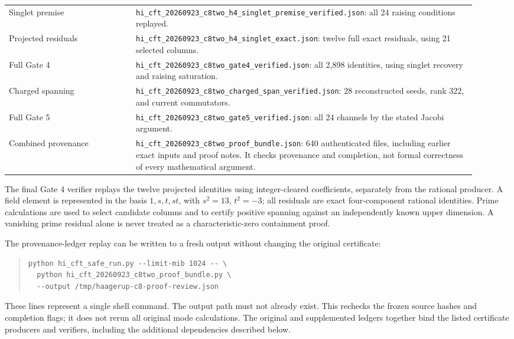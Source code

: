 \documentclass[11pt,a4paper]{article}
\theoremstyle{definition}
\newcommand{\artifact}[1]{\textnormal{\nolinkurl{#1}}}
\begin{document}
\begin{longtable}{@{}p{0.25\linewidth}p{0.67\linewidth}@{}}
Singlet premise &
\artifact{hi_cft_20260923_c8two_h4_singlet_premise_verified.json}:
all 24 raising conditions replayed.\\
Projected residuals &
\artifact{hi_cft_20260923_c8two_h4_singlet_exact.json}:
twelve full exact residuals, using 21 selected columns.\\
Full Gate 4 &
\artifact{hi_cft_20260923_c8two_gate4_verified.json}:
all 2,898 identities, using singlet recovery and raising saturation.\\
Charged spanning &
\artifact{hi_cft_20260923_c8two_charged_span_verified.json}:
28 reconstructed seeds, rank 322, and current commutators.\\
Full Gate 5 &
\artifact{hi_cft_20260923_c8two_gate5_verified.json}:
all 24 channels by the stated Jacobi argument.\\
Combined provenance &
\artifact{hi_cft_20260923_c8two_proof_bundle.json}:
640 authenticated files, including earlier exact inputs and proof notes.
It checks provenance and completion, not formal correctness of every
mathematical argument.\\
\end{longtable}

The final Gate 4 verifier replays the twelve projected identities using
integer-cleared coefficients, separately from the rational producer.
A field element is represented in the basis
\(1,s,t,st\), with \(s^2=13\), \(t^2=-3\); all residuals are
exact four-component rational identities. Prime calculations are used
to select candidate columns and to certify positive spanning against
an independently known upper dimension. A vanishing prime residual
alone is never treated as a characteristic-zero containment proof.

The provenance-ledger replay can be written to a fresh output without
changing the original certificate:
\begin{quote}\small
\begin{verbatim}
python hi_cft_safe_run.py --limit-mib 1024 -- \
  python hi_cft_20260923_c8two_proof_bundle.py \
  --output /tmp/haagerup-c8-proof-review.json
\end{verbatim}
\end{quote}
These lines represent a single shell command. The output path must not
already exist. This rechecks the frozen source hashes and completion
flags; it does not rerun all original mode calculations. The original
and supplemented ledgers together bind the listed certificate
producers and verifiers, including the additional dependencies
described below.
\end{document}
